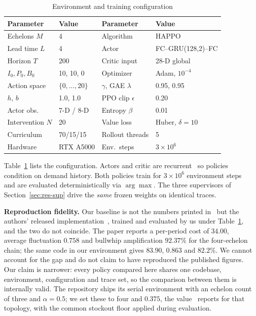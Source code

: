 \documentclass[conference]{IEEEtran}
\begin{document}
\begin{table}[t]
\caption{Environment and training configuration}
\label{tab:config}
\centering
\scriptsize
\setlength{\tabcolsep}{4pt}
\begin{tabular}{@{}llll@{}}
\toprule
Parameter & Value & Parameter & Value \\
\midrule
Echelons $M$ & 4 & Algorithm & HAPPO \\
Lead time $L$ & 4 & Actor & FC--GRU(128,2)--FC \\
Horizon $T$ & 200 & Critic input & 28-D global \\
$I_0, P_0, B_0$ & 10, 10, 0 & Optimizer & Adam, $10^{-4}$ \\
Action space & $\{0,\dots,20\}$ & $\gamma$, GAE $\lambda$ & 0.95, 0.95 \\
$h$, $b$ & 1.0, 1.0 & PPO clip $\epsilon$ & 0.20 \\
Actor obs. & 7-D / 8-D & Entropy $\beta$ & 0.01 \\
Intervention $N$ & 20 & Value loss & Huber, $\delta{=}10$ \\
Curriculum & 70/15/15 & Rollout threads & 5 \\
Hardware & RTX A5000 & Env.\ steps & $3 \times 10^6$ \\
\bottomrule
\end{tabular}
\end{table}

Table~\ref{tab:config} lists the configuration. Actors and critic are
recurrent~\cite{chung2014} so policies condition on demand history. Both
policies train for $3\times10^6$ environment steps and are evaluated
deterministically via $\arg\max$. The three supervisors of
Section~\ref{sec:res-sup} drive the \emph{same} frozen weights on identical
traces.

\textbf{Reproduction fidelity.} Our baseline is not the numbers printed
in~\cite{liu2022} but the authors' released
implementation~\cite{liu2022code}, trained and evaluated by us under
Table~\ref{tab:config}, and the two do not coincide. The paper reports a
per-period cost of $34.00$, average fluctuation $0.758$ and bullwhip
amplification $92.37\%$ for the four-echelon chain; the same code in our
environment gives $83.90$, $0.863$ and $82.2\%$. We cannot account for the
gap and do not claim to have reproduced the published figures. Our claim is
narrower: every policy compared here shares one codebase, environment,
configuration and trace set, so the comparison between them is internally
valid. The repository ships its serial environment with an echelon count of
three and $\alpha = 0.5$; we set these to four and $0.375$, the
value~\cite{liu2022} reports for that topology, with the common stockout floor
applied during evaluation.
\end{document}

